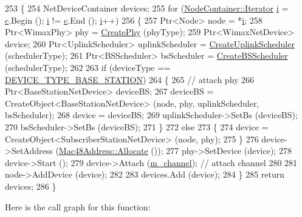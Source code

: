 \begin{DoxyCode}
253 \{
254   NetDeviceContainer devices;
255   \textcolor{keywordflow}{for} (\hyperlink{classns3_1_1NodeContainer_aa1a9f2d2b09bfef7d066d3974bca2cc4}{NodeContainer::Iterator} \hyperlink{bernuolliDistribution_8m_a6f6ccfcf58b31cb6412107d9d5281426}{i} = \hyperlink{lte_2model_2fading-traces_2fading__trace__generator_8m_ae0323a9039add2978bf5b49550572c7c}{c}.Begin (); \hyperlink{bernuolliDistribution_8m_a6f6ccfcf58b31cb6412107d9d5281426}{i} != \hyperlink{lte_2model_2fading-traces_2fading__trace__generator_8m_ae0323a9039add2978bf5b49550572c7c}{c}.End (); 
      \hyperlink{bernuolliDistribution_8m_a6f6ccfcf58b31cb6412107d9d5281426}{i}++)
256     \{
257       Ptr<Node> node = *\hyperlink{bernuolliDistribution_8m_a6f6ccfcf58b31cb6412107d9d5281426}{i};
258       Ptr<WimaxPhy> phy = \hyperlink{classns3_1_1WimaxHelper_a5b287ad1386475dde1e946910a203899}{CreatePhy} (phyType);
259       Ptr<WimaxNetDevice> device;
260       Ptr<UplinkScheduler> uplinkScheduler = \hyperlink{classns3_1_1WimaxHelper_a3b237b459ffd98a13d71612d985f9e90}{CreateUplinkScheduler} (schedulerType);
261       Ptr<BSScheduler> bsScheduler = \hyperlink{classns3_1_1WimaxHelper_a583fc7ce6463c687092e9ef8d03413af}{CreateBSScheduler} (schedulerType);
262 
263       \textcolor{keywordflow}{if} (deviceType == \hyperlink{classns3_1_1WimaxHelper_a2c8fd9211cf4d7605e506b7c983d78fca96e5d9ff34a8a0da1262f37e83abc43b}{DEVICE\_TYPE\_BASE\_STATION})
264         \{
265           \textcolor{comment}{// attach phy}
266           Ptr<BaseStationNetDevice> deviceBS;
267           deviceBS = CreateObject<BaseStationNetDevice> (node, phy, uplinkScheduler, bsScheduler);
268           device = deviceBS;
269           uplinkScheduler->SetBs (deviceBS);
270           bsScheduler->SetBs (deviceBS);
271         \}
272       \textcolor{keywordflow}{else}
273         \{
274           device = CreateObject<SubscriberStationNetDevice> (node, phy);
275         \}
276       device->SetAddress (\hyperlink{classns3_1_1Mac48Address_a203b53c035649c0d4881fa1115aa2cdb}{Mac48Address::Allocate} ());
277       phy->SetDevice (device);
278       device->Start ();
279       device->Attach (\hyperlink{classns3_1_1WimaxHelper_a2d6f863b9fa5d811edd856802ecb0bc3}{m\_channel}); \textcolor{comment}{// attach channel}
280 
281       node->AddDevice (device);
282 
283       devices.Add (device);
284     \}
285   \textcolor{keywordflow}{return} devices;
286 \}
\end{DoxyCode}


Here is the call graph for this function\+:




